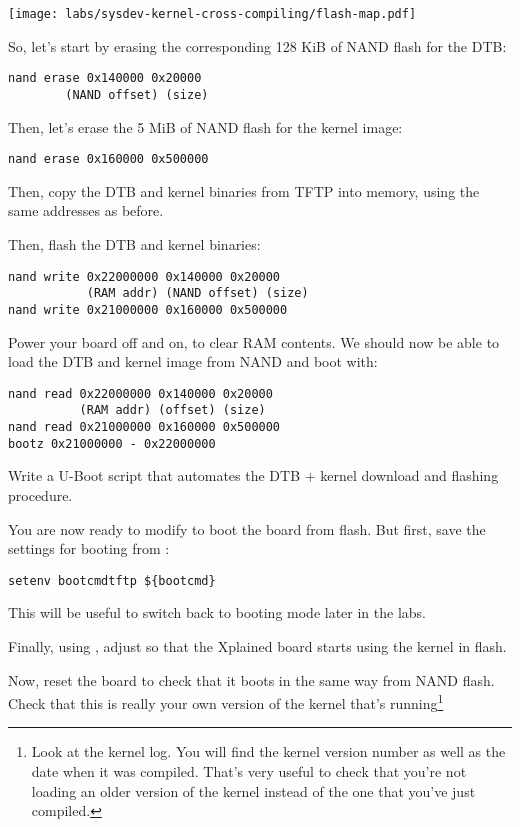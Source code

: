 \begin{center}
  \texttt{[image: labs/sysdev-kernel-cross-compiling/flash-map.pdf]}
\end{center}

So, let's start by erasing the corresponding 128 KiB of NAND flash
for the DTB:

\begin{verbatim}
nand erase 0x140000 0x20000
        (NAND offset) (size)
\end{verbatim}

Then, let's erase the 5 MiB of NAND flash for the kernel image:

\begin{verbatim}
nand erase 0x160000 0x500000
\end{verbatim}

Then, copy the DTB and kernel binaries from TFTP into memory, using the
same addresses as before.

Then, flash the DTB and kernel binaries:

\begin{verbatim}
nand write 0x22000000 0x140000 0x20000
           (RAM addr) (NAND offset) (size)
nand write 0x21000000 0x160000 0x500000
\end{verbatim}

Power your board off and on, to clear RAM contents. We should now be
able to load the DTB and kernel image from NAND and boot with:

\begin{verbatim}
nand read 0x22000000 0x140000 0x20000
          (RAM addr) (offset) (size)
nand read 0x21000000 0x160000 0x500000
bootz 0x21000000 - 0x22000000
\end{verbatim}

Write a U-Boot script that automates the DTB + kernel download
and flashing procedure.

You are now ready to modify  to boot the board
from flash. But first, save the settings for booting from :

\begin{verbatim}
setenv bootcmdtftp ${bootcmd}
\end{verbatim}

This will be useful to switch back to  booting mode
later in the labs.

Finally, using , 
adjust  so that the Xplained board starts
using the kernel in flash.

Now, reset the board to check that it boots
in the same way from NAND flash. Check that this is really your own version of
the kernel that's running\footnote{Look at the kernel log. You will find
the kernel version number as well as the date when it was compiled.
That's very useful to check that you're not loading an older version
of the kernel instead of the one that you've just compiled.}
